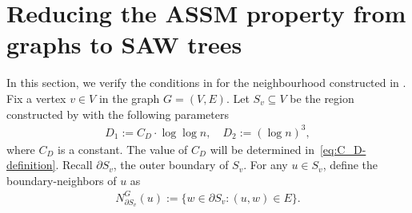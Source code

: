 \documentclass[11pt]{amsart}
\newcommand{\defeq}{:=}
\newcommand{\nbd}[2]{N_{#1}^{#2}}
\theoremstyle{definition}
\theoremstyle{remark}
\begin{document}



\section{Reducing the ASSM property from graphs to SAW trees}
In this section, we verify the conditions in  for the neighbourhood constructed in . 
Fix a vertex $v \in V$ in the graph $G=(V,E)$.
Let $S_v \subseteq V$ be the region constructed by  with the following parameters
\begin{align}\label{eq:parameters-for-S_v-construction}
    D_1 \defeq C_D \cdot \log \log n, \quad D_2 \defeq (\log n)^3,
\end{align}
where $C_D$ is a constant. The value of $C_D$ will be determined in~\eqref{eq:C_D-definition}.
Recall $\partial S_v$, the outer boundary of $S_v$. For any $u \in S_v$, define the boundary-neighbors of $u$ as 
\begin{align}\label{eq:boundary-neighbors}
    \nbd{\partial S_v}{G}(u) \defeq \{w \in \partial S_v: (u,w) \in E\}.
\end{align}
\end{document}
